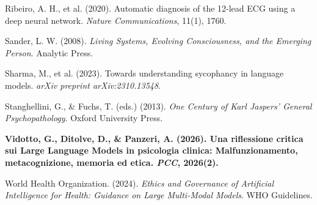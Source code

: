 \documentclass[11pt,a4paper]{article}
\begin{document}
\begin{enumerate}[label={[\arabic*]}]
    \item Ribeiro, A. H., et al. (2020). Automatic diagnosis of the 12-lead ECG using a deep neural network. \textit{Nature Communications}, 11(1), 1760.
    \item Sander, L. W. (2008). \textit{Living Systems, Evolving Consciousness, and the Emerging Person}. Analytic Press.
    \item Sharma, M., et al. (2023). Towards understanding sycophancy in language models. \textit{arXiv preprint arXiv:2310.13548}.
    \item Stanghellini, G., \& Fuchs, T. (eds.) (2013). \textit{One Century of Karl Jaspers' General Psychopathology}. Oxford University Press.
    \item \textbf{Vidotto, G., Ditolve, D., \& Panzeri, A. (2026). Una riflessione critica sui Large Language Models in psicologia clinica: Malfunzionamento, metacognizione, memoria ed etica. \textit{PCC}, 2026(2).}
    \item World Health Organization. (2024). \textit{Ethics and Governance of Artificial Intelligence for Health: Guidance on Large Multi-Modal Models}. WHO Guidelines.
\end{enumerate}
\end{document}
